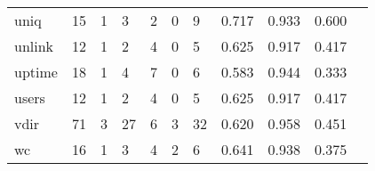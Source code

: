 \begin{longtable}{lp{1.2cm}p{1.2cm}p{1.2cm}p{1.2cm}p{1.2cm}p{1.2cm}p{1.2cm}p{1.2cm}p{1.2cm}p{1.2cm}}
uniq      &                                    15 &                                                  1 &                                                  3 &                                                  2 &                                                  0 &                                                  9 &                                         0.717 &                                              0.933 &                                              0.600 \\
unlink    &                                    12 &                                                  1 &                                                  2 &                                                  4 &                                                  0 &                                                  5 &                                         0.625 &                                              0.917 &                                              0.417 \\
uptime    &                                    18 &                                                  1 &                                                  4 &                                                  7 &                                                  0 &                                                  6 &                                         0.583 &                                              0.944 &                                              0.333 \\
users     &                                    12 &                                                  1 &                                                  2 &                                                  4 &                                                  0 &                                                  5 &                                         0.625 &                                              0.917 &                                              0.417 \\
vdir      &                                    71 &                                                  3 &                                                 27 &                                                  6 &                                                  3 &                                                 32 &                                         0.620 &                                              0.958 &                                              0.451 \\
wc        &                                    16 &                                                  1 &                                                  3 &                                                  4 &                                                  2 &                                                  6 &                                         0.641 &                                              0.938 &                                              0.375 \\

\end{longtable}
